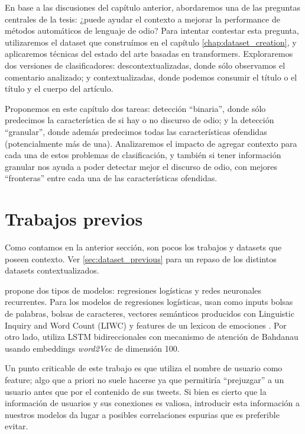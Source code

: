 
En base a las discusiones del capítulo anterior, abordaremos una de las preguntas centrales de la tesis: ¿puede ayudar el contexto a mejorar la performance de métodos automáticos de lenguaje de odio? Para intentar contestar esta pregunta, utilizaremos el dataset que construímos en el capítulo \ref{chap:dataset_creation}, y aplicaremos técnicas del estado del arte basadas en transformers. Exploraremos dos versiones de clasificadores: descontextualizadas, donde sólo observamos el comentario analizado; y contextualizadas, donde podemos consumir el título o el título y el cuerpo del artículo.

Proponemos en este capítulo dos tareas: detección ``binaria'', donde sólo predecimos la característica de si hay o no discurso de odio; y la detección ``granular'', donde además predecimos todas las características ofendidas (potencialmente más de una). Analizaremos el impacto de agregar contexto para cada una de estos problemas de clasificación, y también si tener información granular nos ayuda a poder detectar mejor el discurso de odio, con mejores ``fronteras'' entre cada una de las características ofendidas.


\section{Trabajos previos}
\label{sec:06_classification_previous}

Como contamos en la anterior sección, son pocos los trabajos y datasets que poseen contexto. Ver \ref{sec:dataset_previous} para un repaso de los distintos datasets contextualizados.

\citet{gao-huang-2017-detecting} propone dos tipos de modelos: regresiones logísticas y redes neuronales recurrentes. Para los modelos de regresiones logísticas, usan como inputs bolsas de palabras, bolsas de caracteres, vectores semánticos producidos con Linguistic Inquiry and Word Count (LIWC) \cite{pennebaker2001linguistic} y features de un lexicon de emociones \cite{mohammad2013nrc}. Por otro lado, utiliza LSTM bidireccionales con mecanismo de atención de Bahdanau \cite{bahdanau2014neural} usando embeddings \emph{word2Vec} de dimensión 100.

Un punto criticable de este trabajo es que utiliza el nombre de usuario como feature; algo que a priori no suele hacerse ya que permitiría ``prejuzgar'' a un usuario antes que por el contenido de sus tweets. Si bien es cierto que la información de usuarios y sus conexiones es valiosa, introducir esta información a nuestros modelos da lugar a posibles correlaciones espurias que es preferible evitar.


